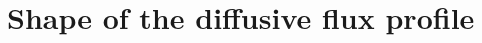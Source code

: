 \documentclass[10pt,superscriptaddress,
amsmath,aps,prc,twocolumn,nofootinbib,floatfix]{revtex4-1}
\newcommand{\JS}[1]{{\color{violet}#1}}
\newcommand{\eps}{\epsilon}
\begin{document}
%


\section{Shape of the diffusive flux profile}
\label{sec:xi-shape}
\end{document}
